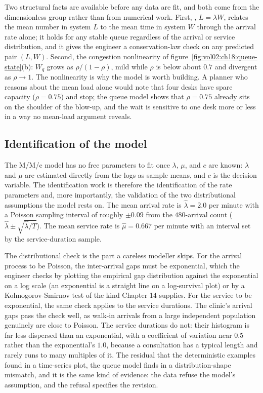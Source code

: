 Two structural facts are available before any data are fit, and both come
from the dimensionless group rather than from numerical work. First,
, $L = \lambda W$, relates the mean number in system
$L$ to the mean time in system $W$ through the arrival rate alone; it holds
for any stable queue regardless of the arrival or service distribution,
and it gives the engineer a conservation-law check on any predicted pair
$(L, W)$. Second, the congestion nonlinearity of
figure~\ref{fig:vol02:ch18:queue-state}(b): $W_q$ grows as
$\rho/(1-\rho)$, mild while $\rho$ is below about $0.7$ and divergent as
$\rho \to 1$. The nonlinearity is why the model is worth building. A
planner who reasons about the mean load alone would note that four desks
have spare capacity ($\rho = 0.75$) and stop; the queue model shows that
$\rho = 0.75$ already sits on the shoulder of the blow-up, and the wait is
sensitive to one desk more or less in a way no mean-load argument reveals.

\subsection{Identification of the model}

The M/M/c model has no free parameters to fit once $\lambda$, $\mu$, and
$c$ are known: $\lambda$ and $\mu$ are estimated directly from the logs as
sample means, and $c$ is the decision variable. The identification work
is therefore the identification of the rate parameters and, more
importantly, the validation of the two distributional assumptions the
model rests on. The mean arrival rate is $\hat\lambda = 2.0$ per minute
with a Poisson sampling interval of roughly $\pm 0.09$ from the
$480$-arrival count ($\hat\lambda \pm \sqrt{\hat\lambda/T}$). The mean
service rate is $\hat\mu = 0.667$ per minute with an interval set by the
service-duration sample.

The distributional check is the part a careless modeller skips. For the
arrival process to be Poisson, the inter-arrival gaps must be exponential,
which the engineer checks by plotting the empirical gap distribution
against the exponential on a log scale (an exponential is a straight line
on a log-survival plot) or by a Kolmogorov-Smirnov test of the kind
Chapter 14 supplies. For the service to be exponential, the same check
applies to the service durations. The clinic's arrival gaps pass the
check well, as walk-in arrivals from a large independent population
genuinely are close to Poisson. The service durations do not: their
histogram is far less dispersed than an exponential, with a coefficient of
variation near $0.5$ rather than the exponential's $1.0$, because a
consultation has a typical length and rarely runs to many multiples of it.
The residual that the deterministic examples found in a time-series plot,
the queue model finds in a distribution-shape mismatch, and it is the same
kind of evidence: the data refuse the model's assumption, and the refusal
specifies the revision.

